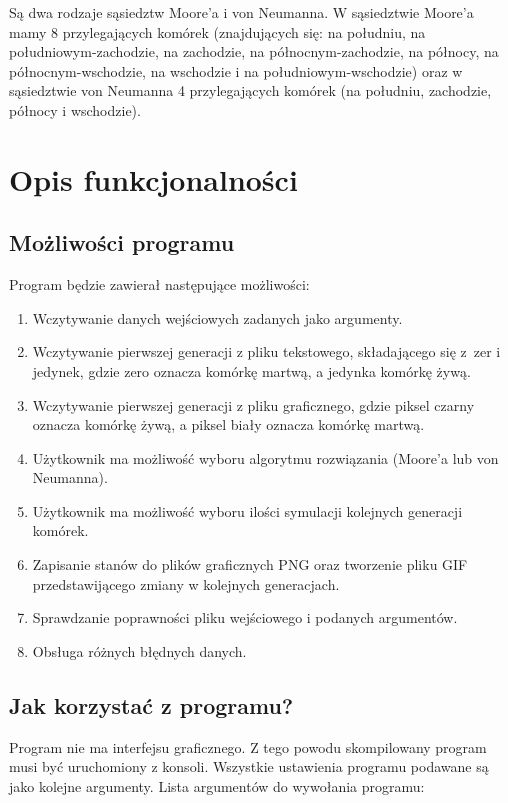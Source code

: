 \documentclass[a4paper, 12pt]{article}
\begin{document}
			\hspace*{1cm} Są dwa rodzaje sąsiedztw Moore'a i von Neumanna. W sąsiedztwie Moore'a mamy 8 przylegających komórek (znajdujących się: na południu, na południowym-zachodzie, na zachodzie, na północnym-zachodzie, na północy, na północnym-wschodzie, na wschodzie i na południowym-wschodzie) oraz w sąsiedztwie von Neumanna 4 przylegających komórek (na południu, zachodzie, północy i wschodzie).
\newpage
	\section{Opis funkcjonalności}
		\subsection{Możliwości programu}
			\hspace*{1cm} Program będzie zawierał następujące możliwości:
		
 		\begin{enumerate}
 			\item Wczytywanie danych wejściowych zadanych jako argumenty.
 			\item Wczytywanie pierwszej generacji z pliku tekstowego, składającego się z~zer i jedynek, gdzie zero oznacza komórkę martwą, a jedynka komórkę żywą.
 			\item Wczytywanie pierwszej generacji z pliku graficznego, gdzie piksel czarny oznacza komórkę żywą, a piksel biały oznacza komórkę martwą.
 			\item Użytkownik ma możliwość wyboru algorytmu rozwiązania (Moore'a lub von Neumanna).
 			\item Użytkownik ma możliwość wyboru ilości symulacji kolejnych generacji komórek.
  			\item Zapisanie stanów do plików graficznych PNG oraz tworzenie pliku GIF przedstawijącego zmiany w kolejnych generacjach.
 			\item Sprawdzanie poprawności pliku wejściowego i podanych argumentów.
 			\item Obsługa różnych błędnych danych.
 		\end{enumerate}
 		
 		\subsection{Jak korzystać z programu?}
 			\hspace*{1cm} Program nie ma interfejsu graficznego. Z tego powodu skompilowany program musi być uruchomiony z konsoli. Wszystkie ustawienia programu podawane są jako kolejne argumenty.\newline
 			\hspace*{1cm} Lista argumentów do wywołania programu:
 		
\end{document}
